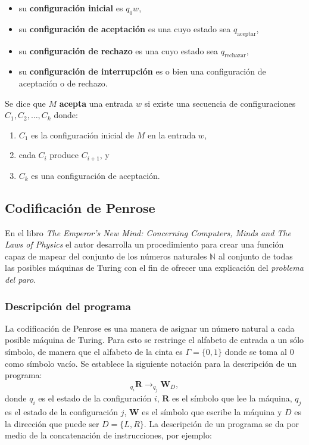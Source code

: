 \documentclass[10pt,a4paper]{article}
\begin{document}
\begin{itemize}
	\item su \textbf{configuración inicial} es $q_0 w$,
	\item su \textbf{configuración de aceptación} es una cuyo estado sea $q_{\text{aceptar}}$,
	\item su \textbf{configuración de rechazo} es una cuyo estado sea $q_{\text{rechazar}}$,
	\item su \textbf{configuración de interrupción} es o bien una configuración de aceptación o de rechazo.
\end{itemize}

Se dice que $M$ \textbf{acepta} una entrada $w$ si existe una secuencia de configuraciones $C_1, C_2, \dots, C_k$ donde:
\begin{enumerate}
	\item $C_1$ es la configuración inicial de $M$ en  la entrada $w$,
	\item cada $C_i$ produce $C_{i+1}$, y
	\item $C_k$ es una configuración de aceptación.
\end{enumerate}

\subsection{Codificación de Penrose}
En el libro \textit{The Emperor's New Mind: Concerning Computers, Minds and The Laws of Physics} \cite{Penrose} el autor desarrolla un procedimiento para crear una función capaz de mapear del conjunto de los números naturales $\mathbb{N}$ al conjunto de todas las posibles máquinas de Turing con el fin de ofrecer una explicación del \textit{problema del paro}.

\subsubsection{Descripción del programa}
La codificación de Penrose es una manera de asignar un número natural a cada posible máquina de Turing. Para esto se restringe el alfabeto de entrada a un sólo símbolo, de manera que el alfabeto de la cinta es $\Gamma = \{0,1\}$ donde se toma al $0$ como símbolo vacío. Se establece la siguiente notación para la descripción de un programa:
\[
	_{q_i}\textbf{R} \rightarrow _{q_j}\textbf{W}_{D},
\]
donde $q_i$ es el estado de la configuración $i$, $\textbf{R}$ es el símbolo que lee la máquina, $q_j$ es el estado de la configuración $j$, $\textbf{W}$ es el símbolo que escribe la máquina y $D$ es la dirección que puede ser $D = \{L,R\}$. La descripción de un programa se da por medio de la concatenación de instrucciones, por ejemplo:
\end{document}
